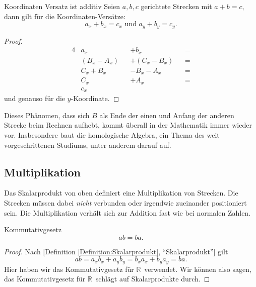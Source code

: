 \documentclass[a4paper]{amsart}
\theoremstyle{definition}
\newcommand{\myRef}[2]{[#1 \ref{#1:#2}, ``#2'']}
\newcommand{\R}{\ensuremath{\mathbb{ R }}}
\begin{document}
\begin{Satz}{Koordinaten Versatz ist additiv}
   Seien $a,b,c$ gerichtete Strecken mit $a + b = c$, dann gilt für die Koordinaten-Versätze:
   \begin{equation}
      a_x + b_x = c_x \text{ und } a_y + b_y = c_y.
   \end{equation}
\end{Satz}
\begin{proof}
   \begin{alignat}{4}
      &a_x         &&+ b_x       &&=\\
      &(B_x - A_x) &&+ (C_x-B_x) &&=\\
      &C_x + B_x   &&- B_x - A_x &&=\\
      &C_x         &&+ A_x       &&=\\
      &c_x
   \end{alignat}
   und genauso für die $y$-Koordinate.
\end{proof}

Dieses Phänomen, dass sich $B$ als Ende der einen und Anfang der anderen Strecke beim Rechnen aufhebt, kommt überall in der Mathematik immer wieder vor. Insbesondere baut die homologische Algebra, ein Thema des weit vorgeschrittenen Studiums, unter anderem darauf auf.

\subsection{Multiplikation}
Das Skalarprodukt von oben definiert eine Multiplikation von Strecken. Die Strecken müssen dabei \emph{nicht} verbunden oder irgendwie zueinander positioniert sein. Die Multiplikation verhält sich zur Addition fast wie bei normalen Zahlen.

\begin{Satz}{Kommutativgesetz}
   \begin{equation}
      ab = ba.
   \end{equation}
\end{Satz}
\begin{proof}
   Nach \myRef{Definition}{Skalarprodukt} gilt
   \begin{equation}
      ab = a_xb_x + a_yb_y = b_xa_x + b_ya_y = ba.
   \end{equation}
   Hier haben wir das Kommutativgesetz für \R\ verwendet. Wir können also sagen, das Kommutativgesetz für \R\ schlägt auf Skalarprodukte durch.
\end{proof}
\end{document}
